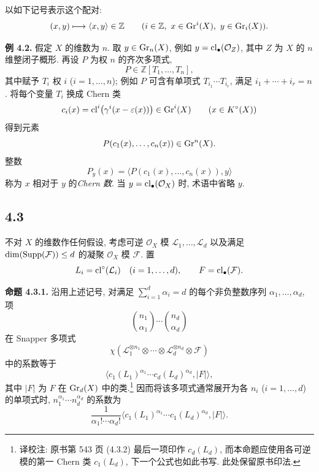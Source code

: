 以如下记号表示这个配对:
\[
(x,y)\longmapsto\langle x,y\rangle\in\mathbb Z
\qquad(i\in\mathbb Z,\ x\in\operatorname{Gr}^i(X),\ y\in\operatorname{Gr}_i(X)).
\]

\textbf{例 4.2.} 假定 $X$ 的维数为 $n$. 取 $y\in\operatorname{Gr}_n(X)$, 例如 $y=\operatorname{cl}_\bullet(\mathcal O_Z)$, 其中 $Z$ 为 $X$ 的 $n$ 维整闭子概形. 再设 $P$ 为权 $n$ 的齐次多项式,
%
%
%
\[
P\in\mathbb Z[T_1,\ldots,T_n],
\]
其中赋予 $T_i$ 权 $i$ ($i=1,\ldots,n$); 例如 $P$ 可含有单项式 $T_{i_1}\cdots T_{i_r}$, 满足 $i_1+\cdots+i_r=n$. 将每个变量 $T_i$ 换成 Chern 类
%
%
\[
c_i(x)=\operatorname{cl}^i\bigl(\gamma^i(x-\varepsilon(x))\bigr)\in\operatorname{Gr}^i(X)
\qquad(x\in K^\circ(X))
\]
得到元素
\[
P(c_1(x),\ldots,c_n(x))\in\operatorname{Gr}^n(X).
\]
整数
\[
P_y(x)=\bigl\langle P(c_1(x),\ldots,c_n(x)),y\bigr\rangle
\]
称为 $x$ 相对于 $y$ 的\emph{Chern 数}. 当 $y=\operatorname{cl}_\bullet(\mathcal O_X)$ 时, 术语中省略 $y$.
%
%

\subsection*{4.3} 不对 $X$ 的维数作任何假设, 考虑可逆 $\mathcal O_X$ 模 $\mathcal L_1,\ldots,\mathcal L_d$ 以及满足 $\dim(\operatorname{Supp}(\mathcal F))\leq d$ 的凝聚 $\mathcal O_X$ 模 $\mathcal F$. 置
%
%
%
%
\[
L_i=\operatorname{cl}^\circ(\mathcal L_i)\quad(i=1,\ldots,d),
\qquad F=\operatorname{cl}_\bullet(\mathcal F).
\]

\textbf{命题 4.3.1.}
沿用上述记号, 对满足 $\sum_{i=1}^d\alpha_i=d$ 的每个非负整数序列 $\alpha_1,\ldots,\alpha_d$, 项
%
%
\[
\binom{n_1}{\alpha_1}\cdots\binom{n_d}{\alpha_d}
\]
在 Snapper 多项式
\[
\chi(\mathcal L_1^{\otimes n_1}\otimes\cdots\otimes
\mathcal L_d^{\otimes n_d}\otimes\mathcal F)
\]
中的系数等于
\begin{equation}\tag{4.3.2}
\bigl\langle c_1(L_1)^{\alpha_1}\cdots
c_d(L_d)^{\alpha_d},\lvert F\rvert\bigr\rangle,
\end{equation}
其中 $\lvert F\rvert$ 为 $F$ 在 $\operatorname{Gr}_d(X)$ 中的类.\footnote{译校注: 原书第 543 页 (4.3.2) 最后一项印作 $c_d(L_d)$, 而本命题应使用各可逆模的第一 Chern 类 $c_1(L_d)$, 下一个公式也如此书写. 此处保留原书印法.} 因而将该多项式通常展开为各 $n_i$ ($i=1,\ldots,d$) 的单项式时, $n_1^{\alpha_1}\cdots n_d^{\alpha_d}$ 的系数为
%
%
\[
  \frac{1}{\alpha_1!\cdots\alpha_d!}
\bigl\langle c_1(L_1)^{\alpha_1}\cdots
c_1(L_d)^{\alpha_d},\lvert F\rvert\bigr\rangle.
\]

